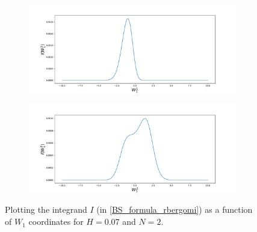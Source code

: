 \documentclass[11pt]{article}
\begin{document}
\begin{figure}[h!]
	\centering
	\begin{subfigure}{.45\textwidth}
		\centering
		\includegraphics[width=1\linewidth]{./figures/integrand_plotting_rBergomi/1D_plots/N_2/H_007/Bergomi_integrand_K_1_H_007_W11_N_2}
		\caption{}
		\label{fig:sub3}
	\end{subfigure}%
	\begin{subfigure}{.45\textwidth}
		\centering
		\includegraphics[width=1\linewidth]{./figures/integrand_plotting_rBergomi/1D_plots/N_2/H_007/Bergomi_integrand_K_1_H_007_W12_N_2}
		\caption{}
		\label{fig:sub4}
	\end{subfigure}
	\caption{Plotting the integrand $I$ (in \eqref{BS_formula_rbergomi}) as a function of $W_1$ coordinates for $H=0.07$ and $N=2$.}
	\label{fig:Integrand_H_007_N_2_W_1}
\end{figure}
\end{document}
